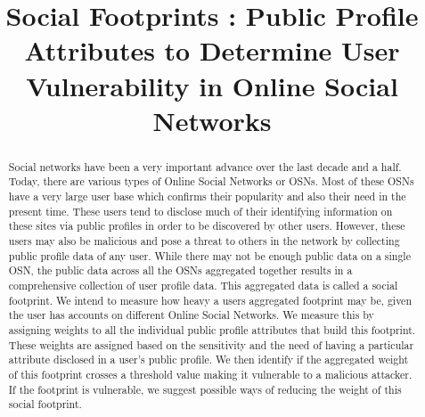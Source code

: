 \documentclass[10pt,conference]{IEEEtran}
\begin{document}
\title{Social Footprints : Public Profile Attributes to Determine User Vulnerability in Online Social Networks}

\author{
}

\maketitle

\begin{abstract}
Social networks have been a very important advance over the last decade and a half. Today, there are various types of Online Social Networks or OSNs. Most of these OSNs have a very large user base which confirms their popularity and also their need in the present time. These users tend to disclose much of their identifying information on these sites via public profiles in order to be discovered by other users. However, these users may also be malicious and pose a threat to others in the network by collecting public profile data of any user. While there may not be enough public data on a single OSN, the public data across all the OSNs aggregated together results in a comprehensive collection of user profile data. This aggregated data is called a social footprint. We intend to measure how heavy a users aggregated footprint may be, given the user has accounts on different Online Social Networks. We measure this by assigning weights to all the individual public profile attributes that build this footprint. These weights are assigned based on the sensitivity and the need of having a particular attribute disclosed in a user's public profile. We then identify if the aggregated weight of this footprint crosses a threshold value making it vulnerable to a malicious attacker. If the footprint is vulnerable, we suggest possible ways of reducing the weight of this social footprint.
\end{abstract}
\end{document}
